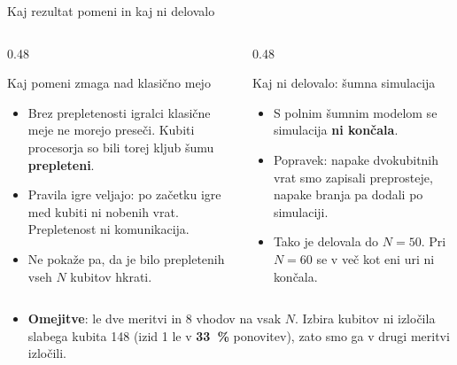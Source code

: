 \documentclass[aspectratio=169,11pt]{beamer}
\newcommand{\poudari}[1]{\textbf{\textcolor{oranzna}{#1}}}
\begin{document}
\begin{frame}{Kaj rezultat pomeni in kaj ni delovalo}
\begin{columns}[T]
\begin{column}{0.48\textwidth}
\begin{block}{Kaj pomeni zmaga nad klasično mejo}
\begin{itemize}
\item Brez prepletenosti igralci klasične meje ne morejo preseči. Kubiti procesorja so bili torej kljub šumu
      \textbf{prepleteni}.
\item Pravila igre veljajo: po začetku igre med kubiti ni nobenih vrat. Prepletenost ni komunikacija.
\item Ne pokaže pa, da je bilo prepletenih vseh $N$ kubitov hkrati.
\end{itemize}
\end{block}
\end{column}
\begin{column}{0.48\textwidth}
\begin{block}{Kaj ni delovalo: šumna simulacija}
\begin{itemize}
\item S polnim šumnim modelom se simulacija \textbf{ni končala}.
\item Popravek: napake dvokubitnih vrat smo zapisali preprosteje, napake branja pa dodali po simulaciji.
\item Tako je delovala do $N=50$. Pri $N=60$ se v več kot eni uri ni končala.
\end{itemize}
\end{block}
\end{column}
\end{columns}
\medskip
\begin{itemize}
\item \textbf{Omejitve}: le dve meritvi in 8 vhodov na vsak $N$. Izbira kubitov ni izločila slabega kubita 148 (izid 1
      le v \poudari{33~\%} ponovitev), zato smo ga v drugi meritvi izločili.
\end{itemize}
\end{frame}
\end{document}
